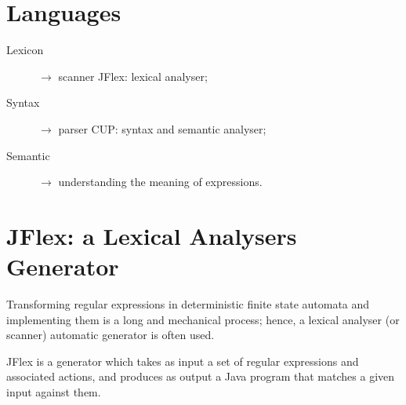 \section{Languages}
\begin{description}
	\item[Lexicon] $\to$ scanner JFlex: lexical analyser;
	\item[Syntax] $\to$ parser CUP: syntax and semantic analyser;
	\item[Semantic] $\to$ understanding the meaning of expressions.
\end{description}

\section{JFlex: a Lexical Analysers Generator}
Transforming regular expressions in deterministic finite state automata and implementing them is a long and mechanical process; hence, a lexical analyser (or scanner) automatic generator is often used.

JFlex is a generator which takes as input a set of regular expressions and associated actions, and produces as output a Java program that matches a given input against them.

